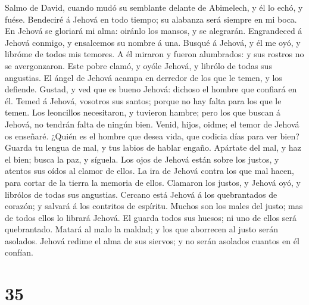  Salmo de David, cuando mudó su semblante delante de
Abimelech, y él lo echó, y fuése. Bendeciré á Jehová en todo tiempo; su
alabanza será siempre en mi boca.  En Jehová se gloriará
mi alma: oiránlo los mansos, y se alegrarán.  Engrandeced
á Jehová conmigo, y ensalcemos su nombre á una.  Busqué á
Jehová, y él me oyó, y libróme de todos mis temores.  A él
miraron y fueron alumbrados: y sus rostros no se avergonzaron.
 Este pobre clamó, y oyóle Jehová, y librólo de todas sus
angustias.  El ángel de Jehová acampa en derredor de los
que le temen, y los defiende.  Gustad, y ved que es bueno
Jehová: dichoso el hombre que confiará en él.  Temed á
Jehová, vosotros sus santos; porque no hay falta para los que le temen.
 Los leoncillos necesitaron, y tuvieron hambre; pero los
que buscan á Jehová, no tendrán falta de ningún bien. 
Venid, hijos, oidme; el temor de Jehová os enseñaré. 
¿Quién es el hombre que desea vida, que codicia días para ver bien?
 Guarda tu lengua de mal, y tus labios de hablar engaño.
 Apártate del mal, y haz el bien; busca la paz, y
síguela.  Los ojos de Jehová están sobre los justos, y
atentos sus oídos al clamor de ellos.  La ira de Jehová
contra los que mal hacen, para cortar de la tierra la memoria de ellos.
 Clamaron los justos, y Jehová oyó, y librólos de todas
sus angustias.  Cercano está Jehová á los quebrantados de
corazón; y salvará á los contritos de espíritu.  Muchos
son los males del justo; mas de todos ellos lo librará Jehová.
 El guarda todos sus huesos; ni uno de ellos será
quebrantado.  Matará al malo la maldad; y los que
aborrecen al justo serán asolados.  Jehová redime el alma
de sus siervos; y no serán asolados cuantos en él confían.

\hypertarget{section-34}{%
\section{35}\label{section-34}}


